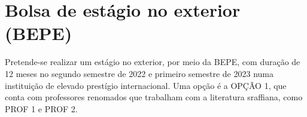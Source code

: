 \section{Bolsa de estágio no exterior (BEPE)}\label{BEPE}

Pretende-se realizar um estágio no exterior, por meio da BEPE, com duração de 12 meses no segundo semestre de 2022 e
primeiro semestre de 2023 numa instituição de elevado prestígio internacional. Uma opção é a OPÇÃO 1, que conta com
professores renomados que trabalham com a literatura sraffiana, como PROF 1 e
PROF 2. 